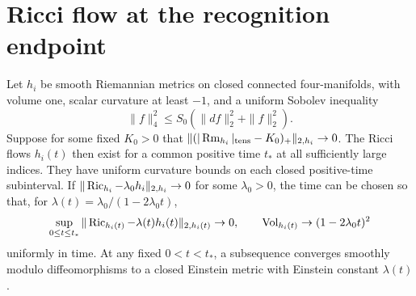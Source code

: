 \section{Ricci flow at the recognition endpoint}\label{sec:endpoint-smoothing}

\begin{lemma}\label{lem:endpoint-smoothing}
Let \(h_i\) be smooth Riemannian metrics on closed connected
four-manifolds, with volume one, scalar curvature at least \(-1\),
and a uniform Sobolev inequality
\begin{equation}\label{eq:smoothing-initial-sob}
 \|f\|_4^2\le S_0(\|df\|_2^2+\|f\|_2^2).
\end{equation}
Suppose for some fixed \(K_0>0\) that
\(\|(|\operatorname{Rm}_{h_i}|_{\rm tens}-K_0)_+\|_{2,h_i}\to0\).
The Ricci flows \(h_i(t)\) then exist for a common positive time
\(t_*\) at all sufficiently large indices. They have uniform
curvature bounds on each closed positive-time subinterval. If
\(\|\operatorname{Ric}_{h_i}-\lambda_0 h_i\|_{2,h_i}\to0\) for some \(\lambda_0>0\),
the time can be chosen so that, for
\(\lambda(t)=\lambda_0/(1-2\lambda_0t)\),
\begin{equation}\label{eq:smoothing-einstein-transport}
 \sup_{0\le t\le t_*}\|\operatorname{Ric}_{h_i(t)}-\lambda(t)h_i(t)\|_{2,h_i(t)}\to0,
 \qquad
 \operatorname{Vol}_{h_i(t)}\to (1-2\lambda_0t)^2
\end{equation}
uniformly in time. At any fixed \(0<t<t_*\), a subsequence converges
smoothly modulo diffeomorphisms to a closed Einstein metric with
Einstein constant \(\lambda(t)\).
\end{lemma}

